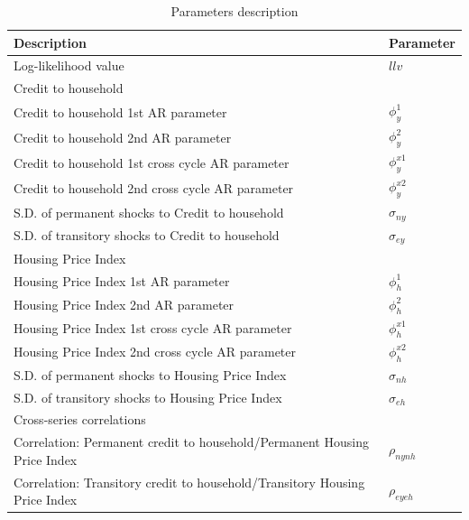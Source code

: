 \documentclass[
  12pt,
]{article}
\begin{document}
        \begin{table}[H]
            \begin{threeparttable}
                \caption {\label{tab:table1} Parameters description}
                \begin{tabular}{@{}ll@{}}
                    \toprule
                    Description & Parameter\\
                    \midrule
                    Log-likelihood value & $llv$ \\[2pt] 
                    Credit to household & \\
                    \quad Credit to household 1st AR parameter  & $\phi^1_{y}$ \\[2pt] 
                    \quad Credit to household 2nd AR parameter  & $\phi^2_{y}$ \\[2pt] 
                    \quad Credit to household 1st cross cycle AR parameter  & $\phi^{x1}_{y}$ \\[2pt] 
                    \quad Credit to household 2nd cross cycle AR parameter  & $\phi^{x2}_{y}$ \\[2pt] 
                    \quad S.D. of permanent shocks to Credit to household & $\sigma_{ny}$ \\[2pt] 
                    \quad S.D. of transitory shocks to Credit to household & $\sigma_{ey}$ \\[2pt]
                    Housing Price Index & \\
                    \quad Housing Price Index 1st AR parameter  & $\phi^1_{h}$ \\[2pt] 
                    \quad Housing Price Index 2nd AR parameter  & $\phi^2_{h}$ \\[2pt] 
                    \quad Housing Price Index 1st cross cycle AR parameter  & $\phi^{x1}_{h}$ \\[2pt] 
                    \quad Housing Price Index 2nd cross cycle AR parameter  & $\phi^{x2}_{h}$ \\[2pt] 
                    \quad S.D. of permanent shocks to Housing Price Index & $\sigma_{nh}$ \\[2pt] 
                    \quad S.D. of transitory shocks to Housing Price Index & $\sigma_{eh}$ \\[2pt]
                    Cross-series correlations & \\
                    \quad Correlation: Permanent credit to household/Permanent Housing Price Index  & $\rho_{nynh}$ \\[2pt] 
                    \quad Correlation: Transitory credit to household/Transitory Housing Price Index  & $\rho_{eyeh}$ \\[2pt] 
                                        

\end{tabular}
\end{threeparttable}
\end{table}
\end{document}
